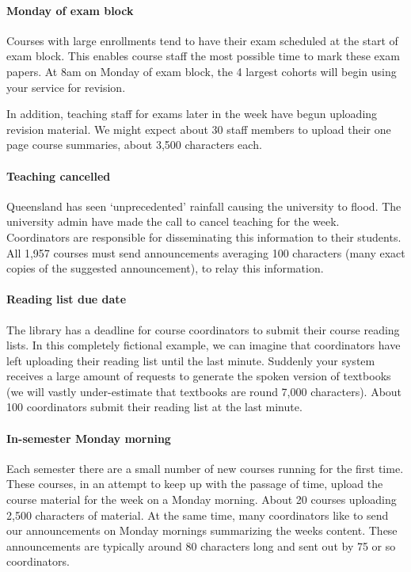 \documentclass{csse4400}
\begin{document}
\paragraph{Monday of exam block}
Courses with large enrollments tend to have their exam scheduled at the start of exam block.
This enables course staff the most possible time to mark these exam papers.
At 8am on Monday of exam block,
the 4 largest cohorts will begin using your service for revision.

In addition, teaching staff for exams later in the week have begun uploading revision material.
We might expect about 30 staff members to upload their one page course summaries,
about 3,500 characters each.

\paragraph{Teaching cancelled}
Queensland has seen `unprecedented' rainfall causing the university to flood.
The university admin have made the call to cancel teaching for the week.
Coordinators are responsible for disseminating this information to their students.
All 1,957 courses must send announcements averaging 100 characters (many exact copies of the suggested announcement),
to relay this information.

\paragraph{Reading list due date}
The library has a deadline for course coordinators to submit their course reading lists.
In this completely fictional example,
we can imagine that coordinators have left uploading their reading list until the last minute.
Suddenly your system receives a large amount of requests to generate the spoken version of textbooks (we will vastly under-estimate that textbooks are round 7,000 characters).
About 100 coordinators submit their reading list at the last minute.

\paragraph{In-semester Monday morning}
Each semester there are a small number of new courses running for the first time.
These courses, in an attempt to keep up with the passage of time,
upload the course material for the week on a Monday morning.
About 20 courses uploading 2,500 characters of material.
At the same time, many coordinators like to send our announcements on Monday mornings summarizing the weeks content.
These announcements are typically around 80 characters long and sent out by 75 or so coordinators.
\end{document}
